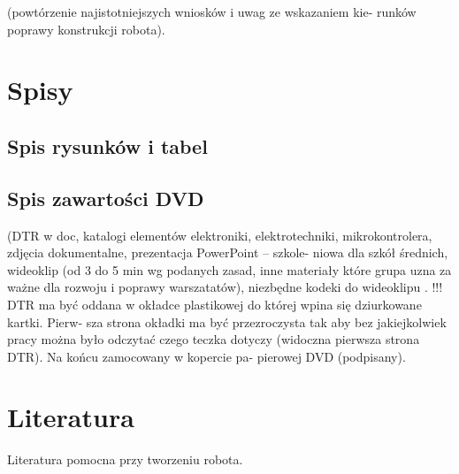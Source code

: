 \documentclass[11pt,a4paper]{article}
\begin{document}
 (powtórzenie najistotniejszych wniosków i uwag ze wskazaniem kie-
runków poprawy konstrukcji robota).

\section{Spisy}
\subsection{Spis rysunków i tabel} 
\subsection{Spis zawartości DVD} (DTR w doc, katalogi elementów elektroniki,
elektrotechniki, mikrokontrolera, zdjęcia dokumentalne, prezentacja PowerPoint – szkole-
niowa dla szkół średnich, wideoklip (od 3 do 5 min wg podanych zasad, inne materiały które
grupa uzna za ważne dla rozwoju i poprawy warszatatów), niezbędne kodeki do wideoklipu .
!!! DTR ma być oddana w okładce plastikowej do której wpina się dziurkowane kartki. Pierw-
sza strona okładki ma być przezroczysta tak aby bez jakiejkolwiek pracy można było odczytać
czego teczka dotyczy (widoczna pierwsza strona DTR). Na końcu zamocowany w kopercie pa-
pierowej DVD (podpisany). 

\section{Literatura}
Literatura pomocna przy tworzeniu robota.
\end{document}
